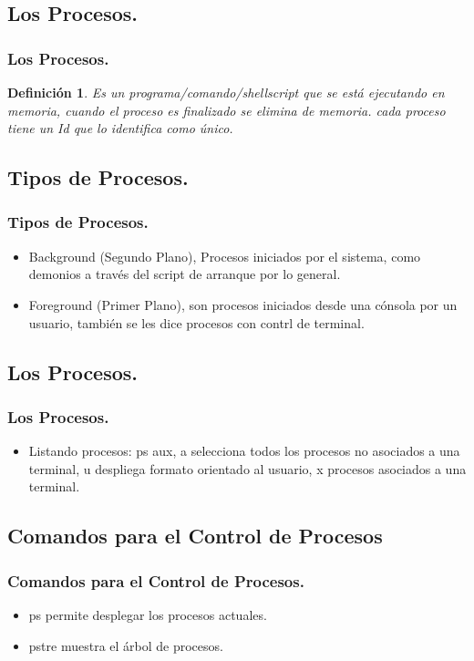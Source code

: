 \documentclass{beamer}
\newtheorem{defi}{{\sc Definición}}
\begin{document}
\subsection{Los Procesos.}
\begin{frame}
\frametitle{Los Procesos.}
\begin{defi}
Es un programa/comando/shellscript que se est\'a ejecutando en memoria, cuando el proceso es finalizado se elimina de memoria. cada proceso tiene un Id que lo identifica como \'unico.
\end{defi}
\end{frame}

\subsection{Tipos de Procesos.}
\begin{frame}
\frametitle{Tipos de Procesos.}
\begin{itemize}
\item Background (Segundo Plano), Procesos iniciados por el sistema, como demonios a trav\'es del  script de arranque por lo general.
\item Foreground (Primer Plano), son procesos iniciados desde una c\'onsola por un usuario, tambi\'en se les dice procesos con contrl de terminal.
\end{itemize}
\end{frame}

\subsection{Los Procesos.}
\begin{frame}
\frametitle{Los Procesos.}
\begin{itemize}
\item Listando procesos: ps aux, a selecciona todos los procesos no asociados a una terminal, u despliega formato orientado al usuario, x procesos asociados a una terminal.
\end{itemize}
\end{frame}

\subsection{Comandos para el Control de Procesos}
\begin{frame}
\frametitle{Comandos para el Control de Procesos.}
\begin{itemize}
\item ps permite desplegar los procesos actuales.
\item pstre muestra el \'arbol de procesos.
\end{itemize}
\end{frame}
\end{document}
